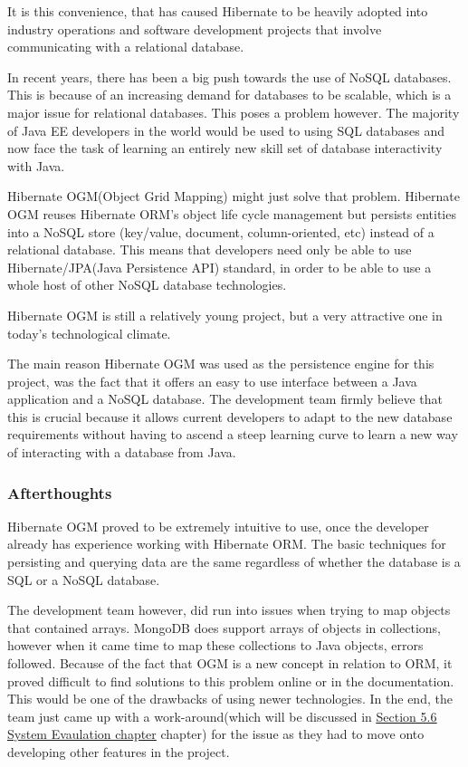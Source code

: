 It is this convenience, that has caused Hibernate to be heavily adopted into industry operations and software development projects that involve communicating with a relational database. 

\bigskip

In recent years, there has been a big push towards the use of NoSQL databases. This is because of an increasing demand for databases to be scalable, which is a major issue for relational databases. This poses a problem however. The majority of Java EE developers in the world would be used to using SQL databases and now face the task of learning an entirely new skill set of database interactivity with Java. 

\bigskip

Hibernate OGM(Object Grid Mapping) might just solve that problem\cite{storl2015schemaless}. Hibernate OGM reuses Hibernate ORM’s object life cycle management but persists entities into a NoSQL store (key/value, document, column-oriented, etc) instead of a relational database. This means that developers need only be able to use Hibernate/JPA(Java Persistence API) standard, in order to be able to use a whole host of other NoSQL database technologies. 

\bigskip

Hibernate OGM is still a relatively young project, but a very attractive one in today's technological climate.

The main reason Hibernate OGM was used as the persistence engine for this project, was the fact that it offers an easy to use interface between a Java application and a NoSQL database. The development team firmly believe that this is crucial because it allows current developers to adapt to the new database requirements without having to ascend a steep learning curve to learn a new way of interacting with a database from Java.

\subsubsection{Afterthoughts}

Hibernate OGM proved to be extremely intuitive to use, once the developer already has experience working with Hibernate ORM. The basic techniques for persisting and querying data are the same regardless of whether the database is a SQL or a NoSQL database.

\bigskip

The development team however, did run into issues when trying to map objects that contained arrays. MongoDB does support arrays of objects in collections, however when it came time to map these collections to Java objects, errors followed. Because of the fact that OGM is a new concept in relation to ORM, it proved difficult to find solutions to this problem online or in the documentation. This would be one of the drawbacks of using newer technologies. In the end, the team just came up with a work-around(which will be discussed in \hyperref[sec:SystemEvaluationObjectMapping]{\underline{Section 5.6 System Evaulation chapter}} chapter) for the issue as they had to move onto developing other features in the project. 

